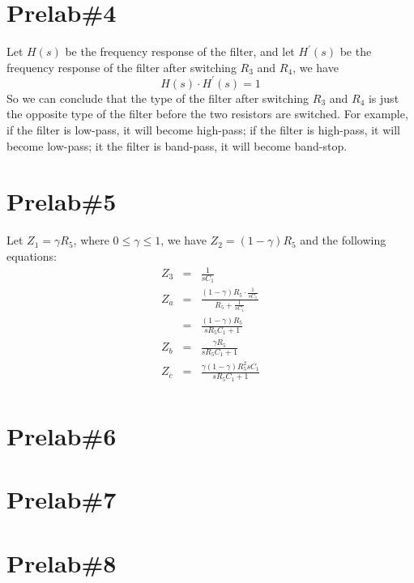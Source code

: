 \documentclass{IEEEtran}
\begin{document}
	\section{\textbf{Prelab\#4}}
	Let $ H(s) $ be the frequency response of the filter, and let $ H^\prime(s) $ be the frequency response of the filter after switching $ R_3 $ and $ R_4 $, we have\\
	\begin{equation*}
		H(s)\cdot H^\prime(s) = 1
	\end{equation*}
	\phantom{ } So we can conclude that the type of the filter after switching $ R_3 $ and $ R_4 $ is just the opposite type of the filter before the two resistors are switched. For example, if the filter is low-pass, it will become high-pass; if the filter is high-pass, it will become low-pass; it the filter is band-pass, it will become band-stop.
	\section{\textbf{Prelab\#5}}
	Let $ Z_1 = \gamma R_5 $, where $ 0 \le \gamma \le 1 $, we have $ Z_2 = (1-\gamma)R_5 $ and the following equations:\\
	\begin{eqnarray*}
		Z_3 & = & \frac{1}{sC_1}\\
		Z_a & = & \frac{(1-\gamma)R_5\cdot\frac{1}{sC_1}}{R_5+\frac{1}{sC_1}}\\
			& = & \frac{(1-\gamma) R_5}{sR_5C_1+1}\\
		Z_b & = & \frac{\gamma R_5}{sR_5C_1+1}\\
		Z_c & = & \frac{\gamma (1-\gamma)R_5^2sC_1}{sR_5C_1+1}\\
	\end{eqnarray*}
	\section{\textbf{Prelab\#6}}
	\section{\textbf{Prelab\#7}}
	\section{\textbf{Prelab\#8}}
\end{document}
